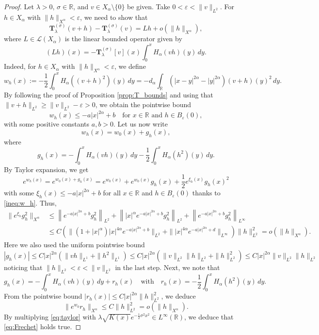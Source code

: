 \documentclass[reqno,10pt,a4paper]{amsart}
\theoremstyle{definition}
\theoremstyle{definition}
\theoremstyle{remark}
\theoremstyle{remark}
\numberwithin{equation}{section}
\newcommand{\R}{\mathbb{R}}
\newcommand{\be}{\begin{equation}}
\newcommand{\ee}{\end{equation}}
\newcommand{\eps}{\varepsilon}
\newcommand{\Tss}{\mathbf{T}^{(\sigma)}_\lambda}
\begin{document}
\begin{appendix}
\begin{proof}
Let $\lambda >0$, $\sigma \in \R$, and $v \in X_\alpha \setminus \{ 0 \}$ be given. Take $0 < \eps < \| v \|_{L^2}$. For $h \in X_\alpha$ with $\| h \|_{X^\alpha} < \eps$, we need to show that
\be \label{eq:Frechet}
\Tss(v+h) - \Tss(v) = L h + o(\| h \|_{X^\alpha}),
\ee
where $L \in \mathcal{L}(X_\alpha)$ is the linear bounded operator given by
$$
(Lh)(x) =-\Tss[v](x) \int_0^x H_\alpha(vh)(y) \, dy.
$$ 
Indeed, for $h \in X_\alpha$ with $\| h \|_{X^\alpha} < \eps$, we define 
$$
w_h(x) := -\frac{1}{2} \int_0^x H_\alpha((v+h)^2)(y) \, dy = -d_\alpha \int_{\R} (|x-y|^{2 \alpha} - |y|^{2 \alpha}) (v+h)(y)^2 \, dy.
$$
By following the proof of Proposition \ref{prop:T_bounds} and using that $\| v+h \|_{L^2} \geq \| v\|_{L^2} -\eps > 0$, we obtain the pointwise bound
\be \label{ineq:w_h}
w_h(x) \leq -a |x|^{2 \alpha} + b \quad \mbox{for $x \in \R$ and $h \in B_\eps(0)$},
\ee 
with some positive constants $a, b > 0$. Let us now write
$$
w_h(x) = w_0(x) + g_h(x),
$$
where
$$
g_h(x) = -\int_0^x H_\alpha(vh)(y) \, dy - \frac{1}{2} \int_0^x H_\alpha(h^2)(y) \, dy.
$$
By Taylor expansion, we get
\be \label{eq:taylor}
e^{w_h(x)} = e^{w_0(x) + g_h(x)} = e^{w_0(x)} + e^{w_0(x)} g_h(x) + \frac{1}{2} e^{\xi_h(x)} g_h(x)^2
\ee
with some $\xi_h(x) \leq -a |x|^{2 \alpha} + b$ for all $x \in \R$ and $h \in B_\eps(0)$ thanks to \eqref{ineq:w_h}. Thus,
\begin{align*}
\| e^{\xi_h} g^2_h \|_{X^\alpha}  & \leq  \left \| e^{-a |x|^{2 \alpha} + b} g_h^2 \right \|_{L^2}  + \left \| |x|^{\alpha} e^{-a |x|^{2 \alpha} + b} g_h^2 \right \|_{L^2} + \left \| e^{-a |x|^{2 \alpha} + b} g_h^2 \right \|_{L^\infty} \\
& \leq C \left ( \| (1+|x|^\alpha) |x|^{4 \alpha} e^{-a |x|^{2 \alpha} + b} \|_{L^2} + \| |x|^{4 \alpha} e^{-a|x|^{2 \alpha} + d} \|_{L^\infty} \right )  \| h \|_{L^2}^2 = o(\| h \|_{X^\alpha}).
\end{align*}
Here we also used the uniform pointwise bound
$$
|g_h(x)| \leq C |x|^{2 \alpha} ( \| v h \|_{L^1} + \| h^2 \|_{L^1}) \leq C |x|^{2 \alpha} (\| v \|_{L^2} \|h \|_{L^2} + \| h \|_{L^2}^2) \leq C |x|^{2 \alpha} \|v \|_{L^2} \| h\|_{L^2} 
$$
noticing that $\| h \|_{L^2} < \eps < \|v \|_{L^2}$ in the last step. Next, we note that
$$
g_h(x) = -\int_0^x H_\alpha(vh)(y) \, dy + r_h(x) \quad \mbox{with} \quad r_h(x) = -\frac{1}{2} \int_0^x H_\alpha(h^2)(y) \, dy.
$$
From the pointwise bound $|r_h(x)| \leq C |x|^{2 \alpha} \| h \|_{L^2}^2$, we deduce
$$
\| e^{w_0} r_h \|_{X^\alpha} \leq C \| h \|_{L^2}^2 = o(\|h \|_{X^\alpha}).
$$
By multiplying \eqref{eq:taylor} with $\lambda \sqrt{K(x)} e^{-\frac{1}{2} \sigma^2 x^2} \in L^\infty(\R)$, we deduce that \eqref{eq:Frechet} holds true.


\end{proof}
\end{appendix}
\end{document}
